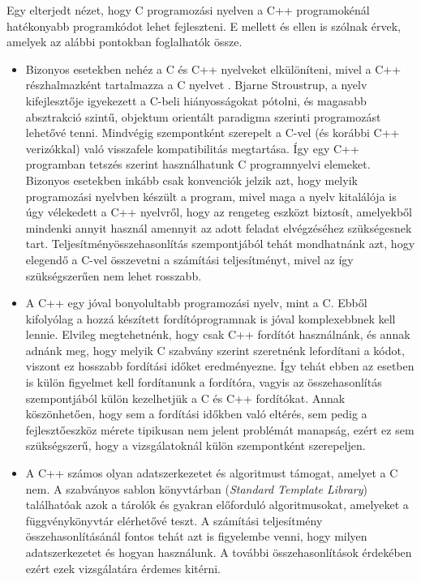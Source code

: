 Egy elterjedt nézet, hogy C programozási nyelven a C++ programokénál hatékonyabb programkódot lehet fejleszteni. E mellett és ellen is szólnak érvek, amelyek az alábbi pontokban foglalhatók össze.
\begin{itemize}
\item Bizonyos esetekben nehéz a C és C++ nyelveket elkülöníteni, mivel a C++ részhalmazként tartalmazza a C nyelvet \cite{cppreference}. Bjarne Stroustrup, a nyelv kifejlesztője igyekezett a C-beli hiányosságokat pótolni, és magasabb absztrakció szintű, objektum orientált paradigma szerinti programozást lehetővé tenni. Mindvégig szempontként szerepelt a C-vel (és korábbi C++ verizókkal) való visszafele kompatibilitás megtartása. Így egy C++ programban tetszés szerint használhatunk C programnyelvi elemeket. Bizonyos esetekben inkább csak konvenciók jelzik azt, hogy melyik programozási nyelvben készült a program, mivel maga a nyelv kitalálója is úgy vélekedett a C++ nyelvről, hogy az rengeteg eszközt biztosít, amelyekből mindenki annyit használ amennyit az adott feladat elvégzéséhez szükségesnek tart. Teljesítményösszehasonlítás szempontjából tehát mondhatnánk azt, hogy elegendő a C-vel összevetni a számítási teljesítményt, mivel az így szükségszerűen nem lehet rosszabb.
\item A C++ egy jóval bonyolultabb programozási nyelv, mint a C. Ebből kifolyólag a hozzá készített fordítóprogramnak is jóval komplexebbnek kell lennie. Elvileg megtehetnénk, hogy csak C++ fordítót használnánk, és annak adnánk meg, hogy melyik C szabvány szerint szeretnénk lefordítani a kódot, viszont ez hosszabb fordítási időket eredményezne. Így tehát ebben az esetben is külön figyelmet kell fordítanunk a fordítóra, vagyis az összehasonlítás szempontjából külön kezelhetjük a C és C++ fordítókat. Annak köszönhetően, hogy sem a fordítási időkben való eltérés, sem pedig a fejlesztőeszköz mérete tipikusan nem jelent problémát manapság, ezért ez sem szükségszerű, hogy a vizsgálatoknál külön szempontként szerepeljen.
\item A C++ számos olyan adatszerkezetet és algoritmust támogat, amelyet a C nem. A szabványos sablon könyvtárban (\textit{Standard Template Library}) találhatóak azok a tárolók és gyakran előforduló algoritmusokat, amelyeket a függvénykönyvtár elérhetővé teszt. A számítási teljesítmény összehasonlításánál fontos tehát azt is figyelembe venni, hogy milyen adatszerkezetet és hogyan használunk. A további összehasonlítások érdekében ezért ezek vizsgálatára érdemes kitérni.
\end{itemize}

